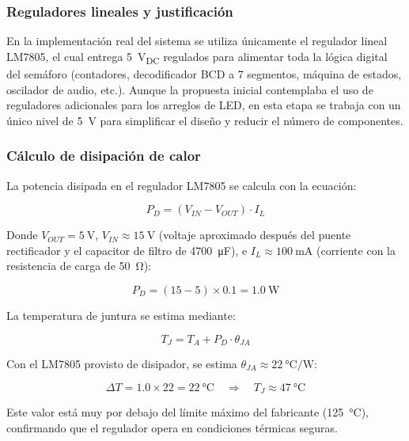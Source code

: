 \documentclass[10pt,onecolumn]{IEEEtran}
\begin{document}
\subsubsection{Reguladores lineales y justificación}

En la implementación real del sistema se utiliza únicamente el regulador lineal LM7805, el cual entrega \SI{5}{\volt_{DC}} regulados para alimentar toda la lógica digital del semáforo (contadores, decodificador BCD a 7 segmentos, máquina de estados, oscilador de audio, etc.). Aunque la propuesta inicial contemplaba el uso de reguladores adicionales para los arreglos de LED, en esta etapa se trabaja con un único nivel de \SI{5}{\volt} para simplificar el diseño y reducir el número de componentes.

\subsubsection{Cálculo de disipación de calor}

La potencia disipada en el regulador LM7805 se calcula con la ecuación:

\begin{equation}
P_D = (V_{IN} - V_{OUT}) \cdot I_L
\label{eq:potencia_disipada}
\end{equation}

Donde $V_{OUT} = \SI{5}{\volt}$, $V_{IN} \approx \SI{15}{\volt}$ (voltaje aproximado después del puente rectificador y el capacitor de filtro de \SI{4700}{\micro\farad}), e $I_L \approx \SI{100}{\milli\ampere}$ (corriente con la resistencia de carga de \SI{50}{\ohm}):

\begin{equation}
P_D = (15 - 5) \times 0.1 = \SI{1.0}{\watt}
\end{equation}

La temperatura de juntura se estima mediante:

\begin{equation}
T_J = T_A + P_D \cdot \theta_{JA}
\label{eq:temp_juntura}
\end{equation}

Con el LM7805 provisto de disipador, se estima $\theta_{JA} \approx \SI{22}{\celsius\per\watt}$:

\[
\Delta T = 1.0 \times 22 = \SI{22}{\celsius} \quad \Rightarrow \quad T_J \approx \SI{47}{\celsius}
\]

Este valor está muy por debajo del límite máximo del fabricante (\SI{125}{\celsius}), confirmando que el regulador opera en condiciones térmicas seguras.
\end{document}
